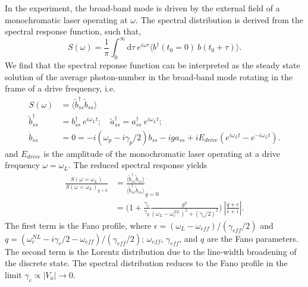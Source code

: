 \documentclass[12pt]{article}
\begin{document}
In the experiment, the broad-band mode is driven by the external
field of a monochromatic laser operating at $\omega$. The spectral 
distribution is derived from the spectral response function, such that,
\begin{equation}
S(\omega) = \frac{1}{\pi} \int_0^{\infty} \mathrm{d}\tau \: 
    e^{i \omega \tau} 
    \langle b^{\dagger}(t_0=0) \: b(t_0 + \tau) \rangle.
\end{equation}
We find that the spectral reponse function can be interpreted as the steady 
state solution of the average photon-number in the broad-band mode rotating 
in the frame of a drive frequency, i.e.
\begin{align}
S(\omega) &= \langle \tilde{b}^{\dagger}_{ss}\tilde{b}_{ss} \rangle
\\
\tilde{b}^{\dagger}_{ss} &= 
    b^{\dagger}_{ss} \: e^{i \omega_L t}; \quad
    \tilde{a}^{\dagger}_{ss} =
    a^{\dagger}_{ss} \: e^{i \omega_L t};
\\
\dot{b}_{ss} &= 0 =
    -i ( \omega_p - i\gamma_p/2 ) b_{ss} - ig a_{ss}
    + iE_{drive}( e^{i \omega_L t} - e^{-i \omega_L t} ).
\end{align}
and $E_{drive}$ is the amplitude of the monochromatic laser operating at
a drive frequency $\omega = \omega_L$. The reduced spectral response yields
\begin{equation}
\begin{split}
\frac{ S(\omega = \omega_L) }{ S(\omega = \omega_L)_{g=0} } &= 
    \frac{\langle \tilde{b}^{\dagger}_{ss}\tilde{b}_{ss} \rangle}
        {\langle \tilde{b}^{\dagger}_{ss}\tilde{b}_{ss} \rangle}_{g=0}
\\
&= \Bigg( 1 +
    \frac{\gamma_c}{\gamma_p}
    \frac{g^2}{(\omega_L - \omega_c^{NL})^2 + (\gamma_c/2)^2}
    \Bigg) \:
    \left\vert \frac{q + \epsilon}{\epsilon + i} \right\vert.
\end{split}
\end{equation}
The first term is the Fano profile, where 
$\epsilon=(\omega_L - \omega_{eff})/(\gamma_{eff}/2)$ and 
$q = (\omega_c^{NL} - i\gamma_c/2 - \omega_{eff})/(\gamma_{eff}/2)$;
$\omega_{eff}$, $\gamma_{eff}$, and $q$ are the Fano parameters. The second
term is the Lorentz distribution due to the line-width broadening of the
discrete state. The spectral distribution reduces to the Fano profile in the
limit $\gamma_c \propto |V_a| \rightarrow 0$.
\end{document}
